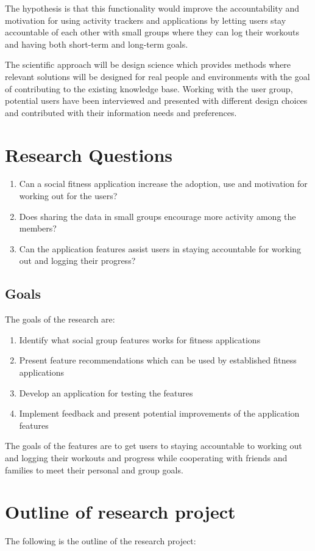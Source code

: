 The hypothesis is that this functionality would improve the accountability and motivation for using activity trackers and applications by letting users stay accountable of each other with small groups where they can log their workouts and having both short-term and long-term goals.

The scientific approach will be design science which provides methods where relevant solutions will be designed for real people and environments with the goal of contributing to the existing knowledge base. Working with the user group, potential users have been interviewed and presented with different design choices and contributed with their information needs and preferences. 


\section{Research Questions}
\begin{enumerate}
    \item Can a social fitness application increase the adoption, use and motivation for working out for the users? 
    \item Does sharing the data in small groups encourage more activity among the members?
    \item Can the application features assist users in staying accountable for working out and logging their progress?
\end{enumerate}
\subsection{Goals}
The goals of the research are:
\begin{enumerate}
\item Identify what social group features works for fitness applications
\item Present feature recommendations which can be used by established fitness applications
\item Develop an application for testing the features
\item Implement feedback and present potential improvements of the application features
\end{enumerate}
The goals of the features are to get users to staying accountable to working out and logging their workouts and progress while cooperating with friends and families to meet their personal and group goals.
 
\newpage
 
\section{Outline of research project}
The following is the outline of the research project:

